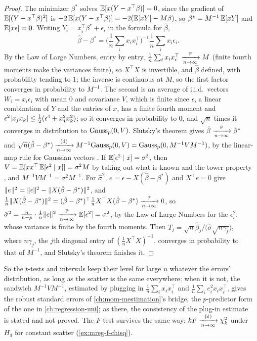 \begin{proof}
The minimizer $\beta^*$ solves $\operatorname*{\mathbb{E}}[x(Y - x^\top\beta)] = 0$, since the gradient of $\operatorname*{\mathbb{E}}[(Y - x^\top\beta)^2]$ is $-2\operatorname*{\mathbb{E}}[x(Y - x^\top\beta)] = -2(\operatorname*{\mathbb{E}}[xY] - M\beta)$, so $\beta^* = M^{-1}\operatorname*{\mathbb{E}}[xY]$ and $\operatorname*{\mathbb{E}}[x\epsilon] = 0$.
Writing $Y_i = x_i^\top\beta^* + \epsilon_i$ in the formula for $\hat{\beta}$,
\[
\hat{\beta} - \beta^* = \Big(\frac1n\sum_i x_ix_i^\top\Big)^{-1}\frac1n\sum_i x_i\epsilon_i.
\]
By the Law of Large Numbers, entry by entry, $\frac1n\sum_i x_ix_i^\top \xrightarrow [n \to \infty ]{\mathbb{P}} M$ (finite fourth moments make the variances finite), so $X^\top X$ is invertible, and $\hat{\beta}$ defined, with probability tending to $1$; the inverse is continuous at $M$, so the first factor converges in probability to $M^{-1}$. The second is an average of i.i.d.\ vectors $W_i = x_i\epsilon_i$ with mean $0$ and covariance $V$, which is finite since $\epsilon$, a linear combination of $Y$ and the entries of $x$, has a finite fourth moment and $\epsilon^2\lvert x_jx_k\rvert \leq \frac12(\epsilon^4 + x_j^2x_k^2)$; so it converges in probability to $0$, and $\sqrt{n}$ times it converges in distribution to $\text{Gauss}_p(0, V)$.
Slutsky's theorem gives $\hat{\beta} \xrightarrow [n \to \infty ]{\mathbb{P}} \beta^*$ and $\sqrt{n}(\hat{\beta} - \beta^*) \xrightarrow [n \to \infty ]{\text{(d)}} M^{-1}\text{Gauss}_p(0, V) = \text{Gauss}_p(0, M^{-1}VM^{-1})$, by the linear-map rule for Gaussian vectors .
If $\operatorname*{\mathbb{E}}[\epsilon^2 \mid x] = \sigma^2$, then $V = \operatorname*{\mathbb{E}}[xx^\top\operatorname*{\mathbb{E}}[\epsilon^2 \mid x]] = \sigma^2M$ by taking out what is known and the tower property , and $M^{-1}VM^{-1} = \sigma^2M^{-1}$.
For $\hat{\sigma}^2$, $e = \epsilon - X(\hat{\beta} - \beta^*)$ and $X^\top e = 0$ give $\lVert e\rVert^2 = \lVert\epsilon\rVert^2 - \lVert X(\hat{\beta} - \beta^*)\rVert^2$, and $\frac1n\lVert X(\hat{\beta} - \beta^*)\rVert^2 = (\hat{\beta} - \beta^*)^\top\frac1n X^\top X(\hat{\beta} - \beta^*) \xrightarrow [n \to \infty ]{\mathbb{P}} 0$, so $\hat{\sigma}^2 = \frac{n}{n-p}\cdot\frac1n\lVert e\rVert^2 \xrightarrow [n \to \infty ]{\mathbb{P}} \operatorname*{\mathbb{E}}[\epsilon^2] = \sigma^2$, by the Law of Large Numbers for the $\epsilon_i^2$, whose variance is finite by the fourth moments.
Then $T_j = \sqrt{n}\hat{\beta}_j\big/\big(\hat{\sigma}\sqrt{n\gamma_j}\big)$, where $n\gamma_j$, the $j$th diagonal entry of $(\frac1n X^\top X)^{-1}$, converges in probability to that of $M^{-1}$, and Slutsky's theorem finishes it.
\end{proof}

So the $t$-tests and intervals keep their level for large $n$ whatever the errors' distribution, as long as the scatter is the same everywhere; when it is not, the sandwich $M^{-1}VM^{-1}$, estimated by plugging in $\frac1n\sum_i x_ix_i^\top$ and $\frac1n\sum_i e_i^2x_ix_i^\top$, gives the robust standard errors of \cref{ch:mom-mestimation}'s bridge, the $p$-predictor form of the one in \cref{ch:regression-uni}; as there, the consistency of the plug-in estimate is stated and not proved.
The $F$-test survives the same way: $kF \xrightarrow [n \to \infty ]{\text{(d)}} \chi^2_k$ under $H_0$ for constant scatter (\cref{ex:mreg-f-chisq}).

